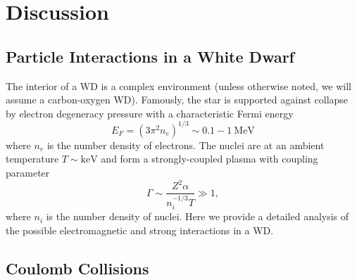 \documentclass[twocolumn,showpacs,preprintnumbers,amsmath,amssymb,prd]{revtex4}
\begin{document}
\section{Discussion}
\label{sec:discussion}

\begin{appendices}

\section{Particle Interactions in a White Dwarf}
\label{sec:appendix}

The interior of a WD is a complex environment (unless otherwise noted, we will assume a carbon-oxygen WD). Famously, the star is supported against collapse by electron degeneracy pressure with a characteristic Fermi energy
\begin{equation}
E_F = (3 \pi^2 n_e)^{1/3} \sim 0.1 - 1 ~\text{MeV}
\end{equation}
where $n_e$ is the number density of electrons. The nuclei are at an ambient temperature $T \sim \text{keV}$ and form a strongly-coupled plasma with coupling parameter
\begin{equation}
\Gamma \sim \frac{Z^2 \alpha}{n_i^{-1/3} T} \gg 1,
\end{equation}
where $n_i$ is the number density of nuclei. Here we provide a detailed analysis of the possible electromagnetic and strong interactions in a WD.

\subsection*{Coulomb Collisions}


\end{appendices}
\end{document}

